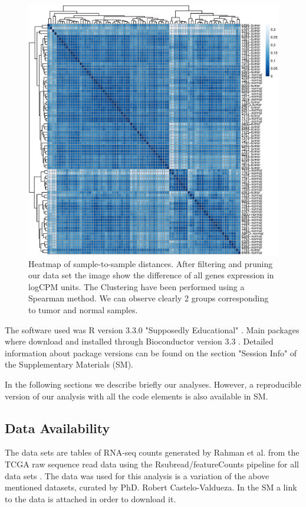 \documentclass[9pt,twocolumn,twoside]{gsajnl}
\begin{document}
\begin{figure}[!h]
\centering

\includegraphics[width=.7\textwidth]{Clustering.eps}

\caption{Heatmap of sample-to-sample distances. After filtering and pruning our data set the image show the difference of all genes expression in logCPM units. The Clustering have been performed using a Spearman method. We can observe clearly 2 groups corresponding to tumor and normal samples. 
}
\label{fig:Clustering}
\end{figure}

The software used was R version 3.3.0 "Supposedly Educational" \cite{R}. Main packages where download and installed through Bioconductor version 3.3 \citep{bioconductor}. Detailed information about package versions can be found on the section "Session Info" of the Supplementary Materials (SM).

In the following sections we describe briefly our analyses. However, a reproducible version of our analysis with all the code elements is also available in SM.


\subsection*{Data Availability}

The data sets are tables of RNA-seq counts generated by Rahman et al. \cite{Rahman15112015} from the TCGA raw sequence read data using the Rsubread/featureCounts pipeline for all data sets \cite{Rsubread}. The data was used for this analysis is a variation of the above mentioned datasets, curated by PhD. Robert Castelo-Valdueza. In the SM a link to the data is attached in order to download it. 
\end{document}
